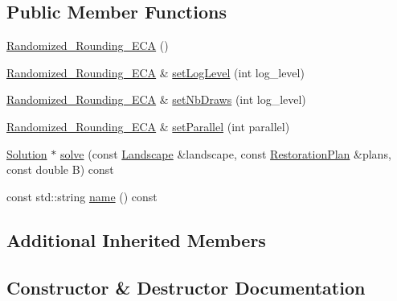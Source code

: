 \subsection*{Public Member Functions}
\begin{DoxyCompactItemize}
\item 
\hyperlink{class_solvers_1_1_randomized___rounding___e_c_a_a81b6832c2158a779130e23d9949aa3f8}{Randomized\+\_\+\+Rounding\+\_\+\+E\+CA} ()
\item 
\hyperlink{class_solvers_1_1_randomized___rounding___e_c_a}{Randomized\+\_\+\+Rounding\+\_\+\+E\+CA} \& \hyperlink{class_solvers_1_1_randomized___rounding___e_c_a_a45af530a702b2f933a3723531eb0e571}{set\+Log\+Level} (int log\+\_\+level)
\item 
\hyperlink{class_solvers_1_1_randomized___rounding___e_c_a}{Randomized\+\_\+\+Rounding\+\_\+\+E\+CA} \& \hyperlink{class_solvers_1_1_randomized___rounding___e_c_a_aba0b81a8be1a129086420decd51df069}{set\+Nb\+Draws} (int log\+\_\+level)
\item 
\hyperlink{class_solvers_1_1_randomized___rounding___e_c_a}{Randomized\+\_\+\+Rounding\+\_\+\+E\+CA} \& \hyperlink{class_solvers_1_1_randomized___rounding___e_c_a_a66ac903b915fcc755c1dd4b0f54ed6ec}{set\+Parallel} (int parallel)
\item 
\hyperlink{class_solution}{Solution} $\ast$ \hyperlink{class_solvers_1_1_randomized___rounding___e_c_a_a2b2c1f0da1e047a5add3fd1bb5e6f0e8}{solve} (const \hyperlink{class_landscape}{Landscape} \&landscape, const \hyperlink{class_restoration_plan}{Restoration\+Plan} \&plans, const double B) const
\item 
const std\+::string \hyperlink{class_solvers_1_1_randomized___rounding___e_c_a_aa9ae623007f23dbd73d367649021c8a9}{name} () const
\end{DoxyCompactItemize}
\subsection*{Additional Inherited Members}


\subsection{Constructor \& Destructor Documentation}
\mbox{\label{class_solvers_1_1_randomized___rounding___e_c_a_a81b6832c2158a779130e23d9949aa3f8}} 
